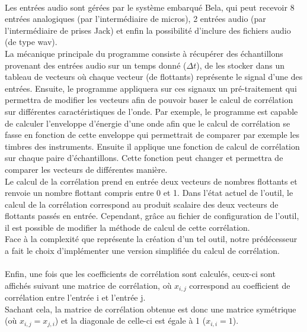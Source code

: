 \documentclass{article}
\begin{document}
\paragraph{}
Les entrées audio sont gérées par le système embarqué Bela, qui peut
recevoir 8 entrées analogiques (par l'intermédiaire de micros), 2 entrées
audio (par l'intermédiaire de prises Jack) et enfin la possibilité d'inclure
des fichiers audio (de type wav).\\
La mécanique principale du programme consiste à récupérer des échantillons
provenant des entrées audio sur un temps donné ($\Delta t$), de les stocker dans
un tableau de vecteurs où chaque vecteur (de flottants) représente le signal d'une des entrées.
Ensuite, le programme appliquera sur ces signaux un pré-traitement qui permettra
de modifier les vecteurs afin de pouvoir baser le calcul de corrélation sur différentes
caractéristiques de l'onde. Par exemple, le programme est capable de calculer
l'enveloppe d’énergie d'une onde afin que le calcul de corrélation se fasse en fonction
de cette enveloppe qui permettrait de comparer par exemple les timbres des instruments.
Ensuite il applique une fonction de calcul de corrélation sur chaque paire d'échantillons.
Cette fonction peut changer et permettra de comparer les vecteurs de différentes manière.
\\
Le calcul de la corrélation prend en entrée deux vecteurs de
nombres flottants et renvoie un nombre flottant compris entre 0 et 1.
Dans l'état actuel de l'outil, le calcul de la corrélation correspond au
produit scalaire des deux vecteurs de flottants passés en entrée. Cependant,
grâce au fichier de configuration de l'outil, il est possible de modifier la
méthode de calcul de cette corrélation.\\
Face à la complexité que représente la création d'un tel outil, notre
prédécesseur a fait le choix d'implémenter une version simplifiée du calcul
de corrélation.
\paragraph{}
Enfin, une fois que les coefficients de corrélation sont calculés, ceux-ci sont
affichés suivant une matrice de corrélation, où $x_{i,j}$ correspond au
coefficient de corrélation entre l'entrée i et l'entrée j.\\
Sachant cela, la matrice de corrélation obtenue est donc une matrice
symétrique (où $x_{i,j} = x_{j,i}$) et la diagonale de celle-ci est égale à
1 ($x_{i,i} = 1$).
\end{document}
